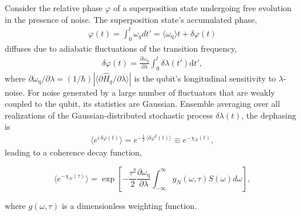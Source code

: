 \documentclass[aip,apr,twocolumn,showpacs,superscriptaddress,groupedaddress,nofootinbib,reprint]{revtex4-1}  %
\newcommand{\freq}{\omega_\text{q}}
\begin{document}
Consider the relative phase $\varphi$ of a superposition state undergoing free evolution in the presence of noise.
The superposition state's accumulated phase,
\begin{align}
    \varphi(t) = \int_0^t \omega_{q} dt' = \langle\omega_{\mathrm{q}}\rangle t + \delta\varphi(t)
\end{align}
diffuses due to adiabatic fluctuations of the transition frequency,
\begin{align}
    \label{eq:del_phi_defn}
    \delta\varphi(t) = \frac{\partial \freq}{\partial \lambda} \int_0^t \delta\lambda(t')\mathrm{d}t',
\end{align}
where $\partial \freq / \partial \lambda = (1/\hbar) |\langle \partial\hat{H}_q / \partial\lambda \rangle |$ is the qubit's longitudinal sensitivity to $\lambda$-noise.
%
For noise generated by a large number of fluctuators that are weakly coupled to the qubit, its statistics are Gaussian.
Ensemble averaging over all realizations of the Gaussian-distributed stochastic process $\delta\lambda(t)$,
the dephasing is
\begin{align}
    \label{eq:ens_avg_phase}
    \langle e^{i\,\delta\varphi(t)} \rangle = e^{-\frac{1}{2}\,\langle \delta\varphi^2(t) \rangle} \equiv e^{-\chi_N(t)},
\end{align}
leading to a coherence decay function,

\begin{equation}
\langle e^{- \chi_N(\tau)} \rangle = \exp\left[-\frac{\tau^2}{2} \frac{\partial \freq}{\partial\lambda} \int_{-\infty}^{\infty}g_N(\omega,\tau)S(\omega)d\omega\right],
\label{Eq:PureDephasing}
\end{equation}

\noindent where $g(\omega,\tau)$ is a dimensionless weighting function.
\end{document}
